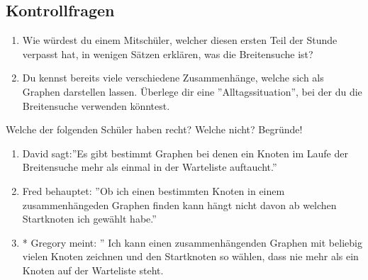 \subsection{Kontrollfragen}
\begin{enumerate}
    \item Wie würdest du einem Mitschüler, welcher diesen ersten Teil der Stunde verpasst hat, in wenigen Sätzen erklären, was die Breitensuche ist?
    \item Du kennst bereits viele verschiedene Zusammenhänge, welche sich als Graphen darstellen lassen. Überlege dir eine ''Alltagssituation'', bei der du die Breitensuche verwenden könntest.
\end{enumerate}
Welche der folgenden Schüler haben recht? Welche nicht? Begründe!
\begin{enumerate}[resume]
    \item David sagt:''Es gibt bestimmt Graphen bei denen ein Knoten im Laufe der Breitensuche mehr als einmal in der Warteliste auftaucht.''
    \item Fred behauptet: ''Ob ich einen bestimmten Knoten in einem zusammenhängeden Graphen finden kann hängt nicht davon ab welchen Startknoten ich gewählt habe.''
    \item * Gregory meint: '' Ich kann einen zusammenhängenden Graphen mit beliebig vielen Knoten zeichnen und den Startknoten so wählen, dass nie mehr als ein Knoten auf der Warteliste steht.
\end{enumerate}

\newpage